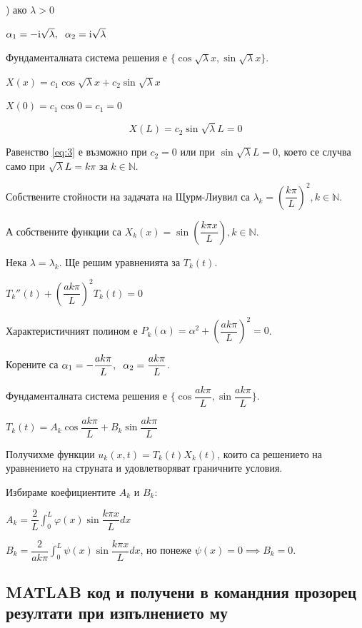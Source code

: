 \documentclass[14pt]{extarticle}
\let\frac\dfrac
\newcommand{\mi}{\mathrm{i}}
\begin{document}
) ако $\lambda > 0$

$ \alpha_1 = -\mi\sqrt{\lambda}, \hspace{2mm} \alpha_2 = \mi\sqrt{\lambda} $

Фундаменталната система решения е $\{ \cos \sqrt{\lambda}x, \sin \sqrt{\lambda}x \}$.

$X(x) = c_1\cos \sqrt{\lambda}x + c_2\sin \sqrt{\lambda}x$

$X(0) = c_1 \cos 0 = c_1 = 0$

\begin{equation}
X(L) = c_2\sin\sqrt{\lambda}L = 0 \tag{3}\label{eq:3}
\end{equation}

Равенство \eqref{eq:3} е възможно при $c_2 = 0$ или при $\sin\sqrt{\lambda}L = 0$, което се случва само при $\sqrt{\lambda}L = k\pi$ за $k \in \mathbb{N}$.

Собствените стойности на задачата на Щурм-Лиувил са $\lambda_k = \left( \frac{k\pi}{L} \right)^2 , k \in \mathbb{N}$.

А собствените функции са $X_k(x) = \sin \left( \frac{k\pi x}{L} \right) , k \in \mathbb{N}$.

Нека $\lambda = \lambda_k$. Ще решим уравненията за $T_k(t)$.

$ T_k''(t) + \left( \frac{ak\pi}{L} \right)^2T_k(t) = 0 $

Характеристичният полином е $ P_k(\alpha) = \alpha^2 + \left( \frac{ak\pi}{L} \right)^2 = 0$.

Корените са $\alpha_1 = -\frac{ak\pi}{L}, \hspace{2mm} \alpha_2 = \frac{ak\pi}{L}$.

Фундаменталната система решения е $\{ \cos\frac{ak\pi}{L}, \sin\frac{ak\pi}{L} \}$.

$T_k(t) = A_k\cos\frac{ak\pi}{L} + B_k\sin\frac{ak\pi}{L}$

Получихме функции $u_k(x,t) = T_k(t)X_k(t)$, които са решението на уравнението на струната и удовлетворяват граничните условия.

Избираме коефициентите $A_k$ и $B_k$:

$\displaystyle A_k = \frac{2}{L} \int_0^L \varphi(x)\sin\frac{k\pi x}{L} dx$

$\displaystyle B_k = \frac{2}{ak\pi} \int_0^L \psi(x)\sin\frac{k\pi x}{L} dx$, но понеже $\psi(x) = 0 \implies B_k = 0$.

\subsection{MATLAB  код и получени в командния прозорец резултати при изпълнението му}
\end{document}
